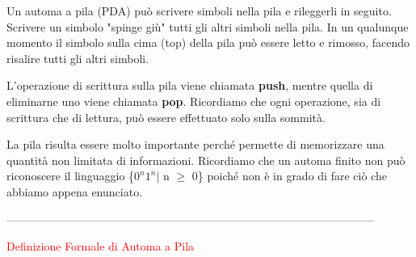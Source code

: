 \documentclass{article}
\begin{document}
\begin{center}

\end{center}

Un automa a pila (PDA) può scrivere simboli nella pila e rileggerli in seguito. Scrivere un simbolo "spinge giù" tutti gli altri simboli nella pila. In un qualunque momento il simbolo sulla cima (top) della pila può essere letto e rimosso, facendo risalire tutti gli altri simboli. 

L'operazione di scrittura sulla pila viene chiamata \textbf{push}, mentre quella di eliminarne uno viene chiamata \textbf{pop}. Ricordiamo che ogni operazione, sia di scrittura che di lettura, può essere effettuato solo sulla sommità.

La pila risulta essere molto importante perché permette di memorizzare una quantità non limitata di informazioni. Ricordiamo che un automa finito non può riconoscere il linguaggio \{$0^n1^n | $ n $\geq$ 0\} poiché non è in grado di fare ciò che abbiamo appena enunciato.

--------------------------------------------------------------------------------------------------

\begin{center}
    \textcolor{red}{Definizione Formale di Automa a Pila}
\end{center}
\end{document}
